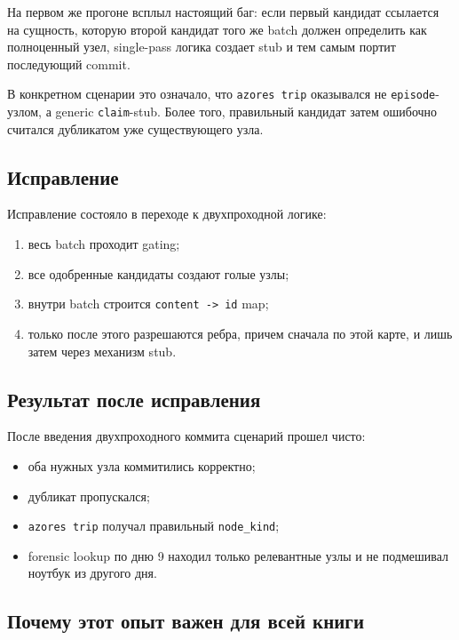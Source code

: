На первом же прогоне всплыл настоящий баг: если первый кандидат ссылается на
сущность, которую второй кандидат того же batch должен определить как полноценный
узел, single-pass логика создает stub и тем самым портит последующий commit.

В конкретном сценарии это означало, что \texttt{azores trip} оказывался не
\texttt{episode}-узлом, а generic \texttt{claim}-stub. Более того, правильный
кандидат затем ошибочно считался дубликатом уже существующего узла.

\subsection{Исправление}

Исправление состояло в переходе к двухпроходной логике:

\begin{enumerate}[leftmargin=2em]
\item весь batch проходит gating;
\item все одобренные кандидаты создают голые узлы;
\item внутри batch строится \texttt{content -> id} map;
\item только после этого разрешаются ребра, причем сначала по этой карте, и лишь
затем через механизм stub.
\end{enumerate}

\subsection{Результат после исправления}

После введения двухпроходного коммита сценарий прошел чисто:

\begin{itemize}[leftmargin=2em]
\item оба нужных узла коммитились корректно;
\item дубликат пропускался;
\item \texttt{azores trip} получал правильный \texttt{node\_kind};
\item forensic lookup по дню 9 находил только релевантные узлы и не подмешивал
ноутбук из другого дня.
\end{itemize}

\subsection{Почему этот опыт важен для всей книги}

